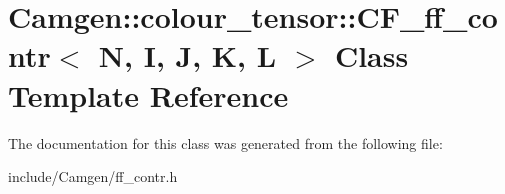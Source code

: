 \hypertarget{a00039}{\section{Camgen\-:\-:colour\-\_\-tensor\-:\-:C\-F\-\_\-ff\-\_\-contr$<$ N, I, J, K, L $>$ Class Template Reference}
\label{a00039}
}


The documentation for this class was generated from the following file\-:\begin{DoxyCompactItemize}
\item 
include/\-Camgen/ff\-\_\-contr.\-h\end{DoxyCompactItemize}
